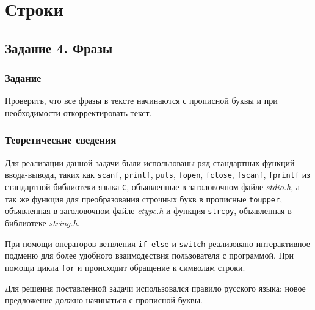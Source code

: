 \documentclass[12pt,a4paper]{report}
\begin{document}
\newpage



\chapter{Строки}
\section{Задание 4. Фразы}
\subsection{Задание}

\hspace{\parindent}Проверить, что все фразы в тексте  начинаются с прописной буквы и при необходимости откорректировать текст.

\subsection{Теоретические сведения}
\hspace{\parindent}Для реализации данной задачи были использованы ряд стандартных функций ввода-вывода, таких как \texttt{scanf}, \texttt{printf}, \texttt{puts}, \texttt{fopen}, \texttt{fclose}, \texttt{fscanf}, \texttt{fprintf} из стандартной библиотеки языка \verb+С+, объявленные в заголовочном файле \textit{stdio.h}, а так же функция для преобразования строчных букв в прописные \verb+toupper+, объявленная в заголовочном файле \textit{ctype.h} и функция \verb+strcpy+, объявленная в библиотеке \textit{string.h}.

При помощи операторов ветвления \texttt{if-else} и \texttt{switch} реализовано интерактивное подменю для более удобного взаимодествия пользователя с программой. При помощи цикла \verb+for+ и происходит обращение к символам строки.

Для решения поставленной задачи использовался правило русского языка: новое предложение должно начинаться с прописной буквы.
\end{document}
